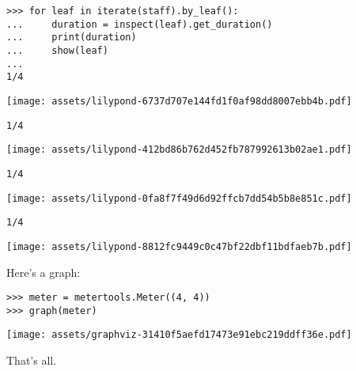\documentclass{article}
\begin{document}
\begin{comment}
<abjad>
for leaf in iterate(staff).by_leaf():
    duration = inspect(leaf).get_duration()
    print(duration)
    show(leaf)

</abjad>
\end{comment}

\begin{singlespacing}
\begin{lstlisting}
>>> for leaf in iterate(staff).by_leaf():
...     duration = inspect(leaf).get_duration()
...     print(duration)
...     show(leaf)
...
1/4
\end{lstlisting}
\noindent\texttt{[image: assets/lilypond-6737d707e144fd1f0af98dd8007ebb4b.pdf]}
\begin{lstlisting}
1/4
\end{lstlisting}
\noindent\texttt{[image: assets/lilypond-412bd86b762d452fb787992613b02ae1.pdf]}
\begin{lstlisting}
1/4
\end{lstlisting}
\noindent\texttt{[image: assets/lilypond-0fa8f7f49d6d92ffcb7dd54b5b8e851c.pdf]}
\begin{lstlisting}
1/4
\end{lstlisting}
\noindent\texttt{[image: assets/lilypond-8812fc9449c0c47bf22dbf11bdfaeb7b.pdf]}
\end{singlespacing}

Here's a graph:

\begin{comment}
<abjad>
meter = metertools.Meter((4, 4))
graph(meter)
</abjad>
\end{comment}

\begin{singlespacing}
\begin{lstlisting}
>>> meter = metertools.Meter((4, 4))
>>> graph(meter)
\end{lstlisting}
\noindent\texttt{[image: assets/graphviz-31410f5aefd17473e91ebc219ddff36e.pdf]}
\end{singlespacing}

That's all.
\end{document}
